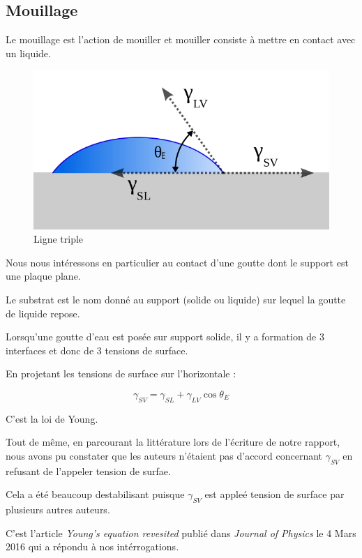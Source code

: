 \documentclass[french]{article}
\begin{document}
\subsection{Mouillage}
Le mouillage est l'action de mouiller et mouiller consiste à  mettre en contact avec un liquide.
\begin{figure}[ht]
	\centering
	\includegraphics[scale = 0.3]{./image/Contact_angle2.png}
	\caption{Ligne triple}
\end{figure}

Nous nous intéressons en particulier au contact d'une goutte dont le support est une plaque plane. 


Le substrat est le nom donné au support (solide ou liquide) sur lequel la goutte de liquide repose.

Lorsqu'une goutte d'eau est posée sur support solide, il y a formation de 3 interfaces et donc de 3 tensions de surface.


En projetant les tensions de surface sur l'horizontale :

\begin{equation}
	\label{eq:Young}
	\gamma_{SV}  = \gamma_{SL} + \gamma_{LV}\cos\theta_{E}
\end{equation}

C'est la loi de Young.


Tout de même, en parcourant la littérature lors de l'écriture de notre rapport, nous avons pu constater que les auteurs n'étaient pas d'accord concernant $\gamma_{SV}$ en refusant de l'appeler tension de surfae.


Cela a été beaucoup destabilisant puisque $\gamma_{SV}$ est appleé tension de surface par plusieurs autres auteurs.

C'est l'article \textit{Young's equation revesited} publié dans \emph{Journal of Physics} le 4 Mars 2016 qui a répondu à nos intérrogations.
\end{document}
